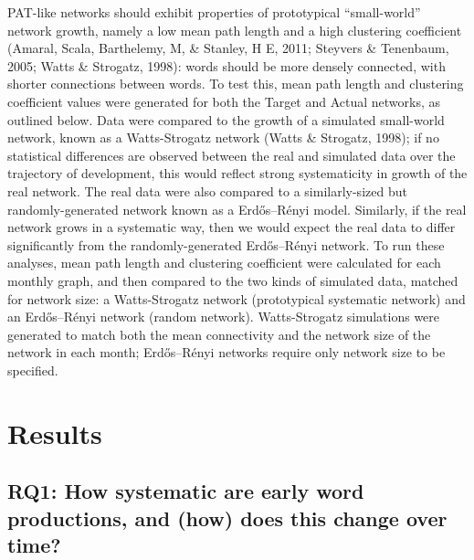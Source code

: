 \documentclass[
  man]{apa6}
\begin{document}
PAT-like networks should exhibit properties of prototypical ``small-world'' network growth, namely a low mean path length and a high clustering coefficient (Amaral, Scala, Barthelemy, M, \& Stanley, H E, 2011; Steyvers \& Tenenbaum, 2005; Watts \& Strogatz, 1998): words should be more densely connected, with shorter connections between words. To test this, mean path length and clustering coefficient values were generated for both the Target and Actual networks, as outlined below. Data were compared to the growth of a simulated small-world network, known as a Watts-Strogatz network (Watts \& Strogatz, 1998); if no statistical differences are observed between the real and simulated data over the trajectory of development, this would reflect strong systematicity in growth of the real network. The real data were also compared to a similarly-sized but randomly-generated network known as a Erdős--Rényi model. Similarly, if the real network grows in a systematic way, then we would expect the real data to differ significantly from the randomly-generated Erdős--Rényi network. To run these analyses, mean path length and clustering coefficient were calculated for each monthly graph, and then compared to the two kinds of simulated data, matched for network size: a Watts-Strogatz network (prototypical systematic network) and an Erdős--Rényi network (random network). Watts-Strogatz simulations were generated to match both the mean connectivity and the network size of the network in each month; Erdős--Rényi networks require only network size to be specified.

\hypertarget{results}{%
\section{Results}\label{results}}

\hypertarget{rq1-how-systematic-are-early-word-productions-and-how-does-this-change-over-time}{%
\subsection{RQ1: How systematic are early word productions, and (how) does this change over time?}\label{rq1-how-systematic-are-early-word-productions-and-how-does-this-change-over-time}}
\end{document}
